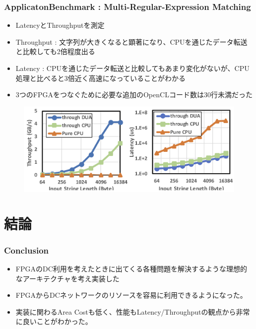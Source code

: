 \documentclass[dvipdfmx,9pt,notheorems]{beamer}
\theoremstyle{definition}
\begin{document}
\begin{frame}\frametitle{ApplicatonBenchmark : Multi-Regular-Expression Matching}
	\begin{itemize}
		\item LatencyとThroughputを測定
		\item Throughput : 文字列が大きくなると顕著になり、CPUを通じたデータ転送と比較しても2倍程度出る
		\item Latency : CPUを通じたデータ転送と比較してもあまり変化がないが、CPU処理と比べると3倍近く高速になっていることがわかる
		\item 3つのFPGAをつなぐために必要な追加のOpenCLコード数は30行未満だった
	\end{itemize}
  \begin{figure}[htb]
		\includegraphics[scale=1.0]{fig/figure13.png}
  \end{figure}
\pnote{
}
\end{frame}

\section{結論}
\begin{frame}\frametitle{Conclusion}
	\begin{itemize}
		\item FPGAのDC利用を考えたときに出てくる各種問題を解決するような理想的なアーキテクチャを考え実装した
		\item FPGAからDCネットワークのリソースを容易に利用できるようになった。
		\item 実装に関わるArea Costも低く、性能もLatency/Throughputの観点から非常に良いことがわかった。
	\end{itemize}
\pnote{
}
\end{frame}


\setcounter{finalframe}{\value{framenumber}}
\setcounter{framenumber}{\value{finalframe}}
\end{document}
